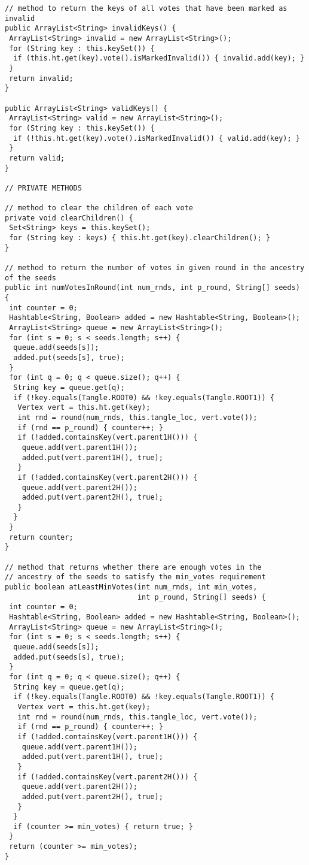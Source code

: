 \begin{Verbatim}
// method to return the keys of all votes that have been marked as invalid
public ArrayList<String> invalidKeys() {
 ArrayList<String> invalid = new ArrayList<String>();
 for (String key : this.keySet()) {
  if (this.ht.get(key).vote().isMarkedInvalid()) { invalid.add(key); }
 }
 return invalid;
}

public ArrayList<String> validKeys() {
 ArrayList<String> valid = new ArrayList<String>();
 for (String key : this.keySet()) {
  if (!this.ht.get(key).vote().isMarkedInvalid()) { valid.add(key); }
 }
 return valid;
}

// PRIVATE METHODS

// method to clear the children of each vote
private void clearChildren() {
 Set<String> keys = this.keySet();
 for (String key : keys) { this.ht.get(key).clearChildren(); }
}

// method to return the number of votes in given round in the ancestry of the seeds
public int numVotesInRound(int num_rnds, int p_round, String[] seeds) {
 int counter = 0;
 Hashtable<String, Boolean> added = new Hashtable<String, Boolean>();
 ArrayList<String> queue = new ArrayList<String>();	
 for (int s = 0; s < seeds.length; s++) {
  queue.add(seeds[s]);
  added.put(seeds[s], true);
 }
 for (int q = 0; q < queue.size(); q++) {
  String key = queue.get(q);										
  if (!key.equals(Tangle.ROOT0) && !key.equals(Tangle.ROOT1)) {
   Vertex vert = this.ht.get(key);								
   int rnd = round(num_rnds, this.tangle_loc, vert.vote());	
   if (rnd == p_round) { counter++; }							
   if (!added.containsKey(vert.parent1H())) {					
    queue.add(vert.parent1H());
    added.put(vert.parent1H(), true);
   }
   if (!added.containsKey(vert.parent2H())) {					
    queue.add(vert.parent2H());
    added.put(vert.parent2H(), true);
   }
  }
 }
 return counter;
}

// method that returns whether there are enough votes in the
// ancestry of the seeds to satisfy the min_votes requirement
public boolean atLeastMinVotes(int num_rnds, int min_votes, 
                               int p_round, String[] seeds) {
 int counter = 0;
 Hashtable<String, Boolean> added = new Hashtable<String, Boolean>();
 ArrayList<String> queue = new ArrayList<String>();						
 for (int s = 0; s < seeds.length; s++) {
  queue.add(seeds[s]);
  added.put(seeds[s], true);
 }
 for (int q = 0; q < queue.size(); q++) {								
  String key = queue.get(q);										
  if (!key.equals(Tangle.ROOT0) && !key.equals(Tangle.ROOT1)) {
   Vertex vert = this.ht.get(key);								
   int rnd = round(num_rnds, this.tangle_loc, vert.vote());	
   if (rnd == p_round) { counter++; }							
   if (!added.containsKey(vert.parent1H())) {					
    queue.add(vert.parent1H());
    added.put(vert.parent1H(), true);
   }
   if (!added.containsKey(vert.parent2H())) {					
    queue.add(vert.parent2H()); 
    added.put(vert.parent2H(), true);
   }
  }
  if (counter >= min_votes) { return true; }
 }
 return (counter >= min_votes);
}


\end{Verbatim}
